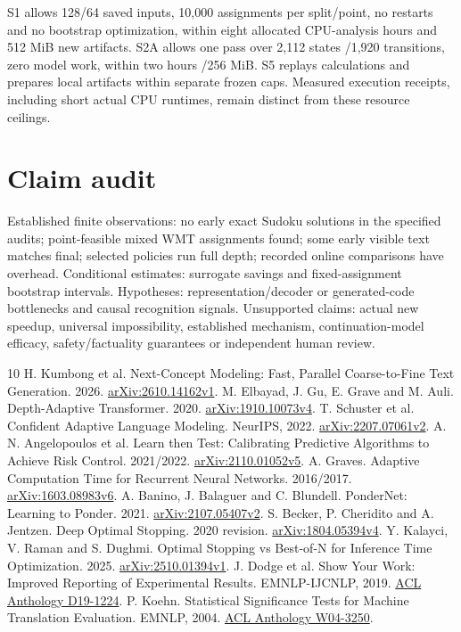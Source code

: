 \documentclass[11pt]{article}
\begin{document}
S1 allows 128/64 saved inputs, 10,000 assignments per split/point, no restarts and no bootstrap optimization, within eight allocated CPU-analysis hours and 512 MiB new artifacts. S2A allows one pass over 2,112 states /1,920 transitions, zero model work, within two hours /256 MiB. S5 replays calculations and prepares local artifacts within separate frozen caps. Measured execution receipts, including short actual CPU runtimes, remain distinct from these resource ceilings.

\section{Claim audit}
Established finite observations: no early exact Sudoku solutions in the specified audits; point-feasible mixed WMT assignments found; some early visible text matches final; selected policies run full depth; recorded online comparisons have overhead. Conditional estimates: surrogate savings and fixed-assignment bootstrap intervals. Hypotheses: representation/decoder or generated-code bottlenecks and causal recognition signals. Unsupported claims: actual new speedup, universal impossibility, established mechanism, continuation-model efficacy, safety/factuality guarantees or independent human review.

\begin{thebibliography}{10}
 H. Kumbong et al. Next-Concept Modeling: Fast, Parallel Coarse-to-Fine Text Generation. 2026. \href{https://arxiv.org/abs/2610.14162v1}{arXiv:2610.14162v1}.
 M. Elbayad, J. Gu, E. Grave and M. Auli. Depth-Adaptive Transformer. 2020. \href{https://arxiv.org/abs/1910.10073v4}{arXiv:1910.10073v4}.
 T. Schuster et al. Confident Adaptive Language Modeling. NeurIPS, 2022. \href{https://arxiv.org/abs/2207.07061v2}{arXiv:2207.07061v2}.
 A. N. Angelopoulos et al. Learn then Test: Calibrating Predictive Algorithms to Achieve Risk Control. 2021/2022. \href{https://arxiv.org/abs/2110.01052v5}{arXiv:2110.01052v5}.
 A. Graves. Adaptive Computation Time for Recurrent Neural Networks. 2016/2017. \href{https://arxiv.org/abs/1603.08983v6}{arXiv:1603.08983v6}.
 A. Banino, J. Balaguer and C. Blundell. PonderNet: Learning to Ponder. 2021. \href{https://arxiv.org/abs/2107.05407v2}{arXiv:2107.05407v2}.
 S. Becker, P. Cheridito and A. Jentzen. Deep Optimal Stopping. 2020 revision. \href{https://arxiv.org/abs/1804.05394v4}{arXiv:1804.05394v4}.
 Y. Kalayci, V. Raman and S. Dughmi. Optimal Stopping vs Best-of-N for Inference Time Optimization. 2025. \href{https://arxiv.org/abs/2510.01394v1}{arXiv:2510.01394v1}.
 J. Dodge et al. Show Your Work: Improved Reporting of Experimental Results. EMNLP-IJCNLP, 2019. \href{https://aclanthology.org/D19-1224/}{ACL Anthology D19-1224}.
 P. Koehn. Statistical Significance Tests for Machine Translation Evaluation. EMNLP, 2004. \href{https://aclanthology.org/W04-3250/}{ACL Anthology W04-3250}.
\end{thebibliography}
\end{document}

